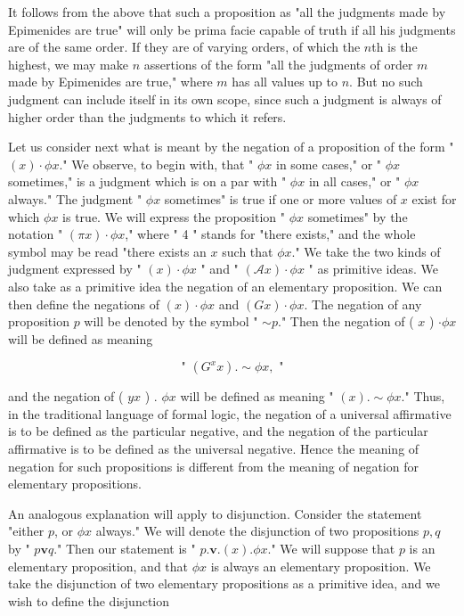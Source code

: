\documentclass[10pt]{article}
\begin{document}
It follows from the above that such a proposition as "all the judgments made by Epimenides are true" will only be prima facie capable of truth if all his judgments are of the same order. If they are of varying orders, of which the $n$th is the highest, we may make $n$ assertions of the form "all the judgments of order $m$ made by Epimenides are true," where $m$ has all values up to $n$. But no such judgment can include itself in its own scope, since such a judgment is always of higher order than the judgments to which it refers.

Let us consider next what is meant by the negation of a proposition of the form " $(x) \cdot \phi x$." We observe, to begin with, that " $\phi x$ in some cases," or " $\phi x$ sometimes," is a judgment which is on a par with " $\phi x$ in all cases," or " $\phi x$ always." The judgment " $\phi x$ sometimes" is true if one or more values of $x$ exist for which $\phi x$ is true. We will express the proposition " $\phi x$ sometimes" by the notation " $(\pi x) \cdot \phi x$," where " 4 " stands for "there exists," and the whole symbol may be read "there exists an $x$ such that $\phi x$." We take the two kinds of judgment expressed by " $(x) \cdot \phi x$ " and " $(\mathcal{A} x) \cdot \phi x$ " as primitive ideas. We also take as a primitive idea the negation of an elementary proposition. We can then define the negations of $(x) \cdot \phi x$ and $(G x) \cdot \phi x$. The negation of any proposition $p$ will be denoted by the symbol " $\sim p$." Then the negation of ( $x$ ) $\cdot \phi x$ will be defined as meaning

$$
\text { " }\left(G^{x} x\right) . \sim \phi x, \text { " }
$$

and the negation of ( $y x$ ) . $\phi x$ will be defined as meaning " $(x) . \sim \phi x$." Thus, in the traditional language of formal logic, the negation of a universal affirmative is to be defined as the particular negative, and the negation of the particular affirmative is to be defined as the universal negative. Hence the meaning of negation for such propositions is different from the meaning of negation for elementary propositions.

An analogous explanation will apply to disjunction. Consider the statement "either $p$, or $\phi x$ always." We will denote the disjunction of two propositions $p, q$ by " $p \mathbf{v} q$." Then our statement is " $p . \mathbf{v} .(x) . \phi x$." We will suppose that $p$ is an elementary proposition, and that $\phi x$ is always an elementary proposition. We take the disjunction of two elementary propositions as a primitive idea, and we wish to define the disjunction
\end{document}
